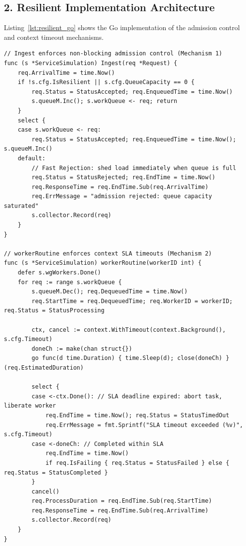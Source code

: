 \documentclass[11pt]{article}
\begin{document}
\subsection*{2. Resilient Implementation Architecture}
Listing~\ref{lst:resilient_go} shows the Go implementation of the admission control and context timeout mechanisms.

\begin{lstlisting}[style=gostyle, caption={Resilient Intake and Worker Implementation in Go}, label={lst:resilient_go}]
// Ingest enforces non-blocking admission control (Mechanism 1)
func (s *ServiceSimulation) Ingest(req *Request) {
    req.ArrivalTime = time.Now()
    if !s.cfg.IsResilient || s.cfg.QueueCapacity == 0 {
        req.Status = StatusAccepted; req.EnqueuedTime = time.Now()
        s.queueM.Inc(); s.workQueue <- req; return
    }
    select {
    case s.workQueue <- req:
        req.Status = StatusAccepted; req.EnqueuedTime = time.Now(); s.queueM.Inc()
    default:
        // Fast Rejection: shed load immediately when queue is full
        req.Status = StatusRejected; req.EndTime = time.Now()
        req.ResponseTime = req.EndTime.Sub(req.ArrivalTime)
        req.ErrMessage = "admission rejected: queue capacity saturated"
        s.collector.Record(req)
    }
}

// workerRoutine enforces context SLA timeouts (Mechanism 2)
func (s *ServiceSimulation) workerRoutine(workerID int) {
    defer s.wgWorkers.Done()
    for req := range s.workQueue {
        s.queueM.Dec(); req.DequeuedTime = time.Now()
        req.StartTime = req.DequeuedTime; req.WorkerID = workerID; req.Status = StatusProcessing

        ctx, cancel := context.WithTimeout(context.Background(), s.cfg.Timeout)
        doneCh := make(chan struct{})
        go func(d time.Duration) { time.Sleep(d); close(doneCh) }(req.EstimatedDuration)

        select {
        case <-ctx.Done(): // SLA deadline expired: abort task, liberate worker
            req.EndTime = time.Now(); req.Status = StatusTimedOut
            req.ErrMessage = fmt.Sprintf("SLA timeout exceeded (%v)", s.cfg.Timeout)
        case <-doneCh: // Completed within SLA
            req.EndTime = time.Now()
            if req.IsFailing { req.Status = StatusFailed } else { req.Status = StatusCompleted }
        }
        cancel()
        req.ProcessDuration = req.EndTime.Sub(req.StartTime)
        req.ResponseTime = req.EndTime.Sub(req.ArrivalTime)
        s.collector.Record(req)
    }
}
\end{lstlisting}
\end{document}
